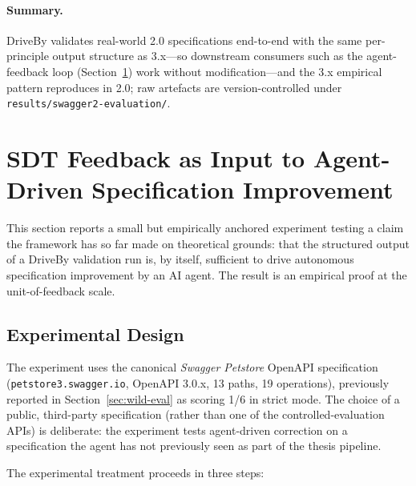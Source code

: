 \paragraph{Summary.} DriveBy validates real-world 2.0 specifications end-to-end with the same per-principle output structure as 3.x---so downstream consumers such as the agent-feedback loop (Section~\ref{sec:sdt-feedback-experiment}) work without modification---and the 3.x empirical pattern reproduces in 2.0; raw artefacts are version-controlled under \texttt{results/swagger2-evaluation/}.

\section{SDT Feedback as Input to Agent-Driven Specification Improvement}
\label{sec:sdt-feedback-experiment}

This section reports a small but empirically anchored experiment testing a claim the framework has so far made on theoretical grounds: that the structured output of a DriveBy validation run is, by itself, sufficient to drive autonomous specification improvement by an AI agent. The result is an empirical proof at the unit-of-feedback scale.

\subsection{Experimental Design}
\label{subsec:sdt-feedback-design}

The experiment uses the canonical \emph{Swagger Petstore} OpenAPI specification (\texttt{petstore3.swagger.io}, OpenAPI 3.0.x, 13 paths, 19 operations), previously reported in Section~\ref{sec:wild-eval} as scoring 1/6 in strict mode. The choice of a public, third-party specification (rather than one of the controlled-evaluation APIs) is deliberate: the experiment tests agent-driven correction on a specification the agent has not previously seen as part of the thesis pipeline.

The experimental treatment proceeds in three steps:

